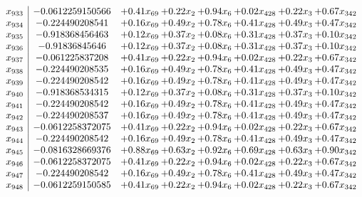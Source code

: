 \documentclass[8pt]{article}
\begin{document}
\[\begin{array}{c| c c@{\hskip 2pt} c@{\hskip 2pt} c@{\hskip 2pt} c@{\hskip 2pt} c@{\hskip 2pt} c@{\hskip 2pt} }
 x_{933}   &  -0.0612259150566 & +  0.41 x_{69} & +  0.22 x_{2} & +  0.94 x_{6} & +  0.02 x_{428} & +  0.22 x_{3} & +  0.67 x_{342}\\
 x_{934}   &  -0.224490208541 & +  0.16 x_{69} & +  0.49 x_{2} & +  0.78 x_{6} & +  0.41 x_{428} & +  0.49 x_{3} & +  0.47 x_{342}\\
 x_{935}   &  -0.918368456463 & +  0.12 x_{69} & +  0.37 x_{2} & +  0.08 x_{6} & +  0.31 x_{428} & +  0.37 x_{3} & +  0.10 x_{342}\\
 x_{936}   &  -0.91836845646 & +  0.12 x_{69} & +  0.37 x_{2} & +  0.08 x_{6} & +  0.31 x_{428} & +  0.37 x_{3} & +  0.10 x_{342}\\
 x_{937}   &  -0.061225837208 & +  0.41 x_{69} & +  0.22 x_{2} & +  0.94 x_{6} & +  0.02 x_{428} & +  0.22 x_{3} & +  0.67 x_{342}\\
 x_{938}   &  -0.224490208535 & +  0.16 x_{69} & +  0.49 x_{2} & +  0.78 x_{6} & +  0.41 x_{428} & +  0.49 x_{3} & +  0.47 x_{342}\\
 x_{939}   &  -0.224490208542 & +  0.16 x_{69} & +  0.49 x_{2} & +  0.78 x_{6} & +  0.41 x_{428} & +  0.49 x_{3} & +  0.47 x_{342}\\
 x_{940}   &  -0.918368534315 & +  0.12 x_{69} & +  0.37 x_{2} & +  0.08 x_{6} & +  0.31 x_{428} & +  0.37 x_{3} & +  0.10 x_{342}\\
 x_{941}   &  -0.224490208542 & +  0.16 x_{69} & +  0.49 x_{2} & +  0.78 x_{6} & +  0.41 x_{428} & +  0.49 x_{3} & +  0.47 x_{342}\\
 x_{942}   &  -0.224490208537 & +  0.16 x_{69} & +  0.49 x_{2} & +  0.78 x_{6} & +  0.41 x_{428} & +  0.49 x_{3} & +  0.47 x_{342}\\
 x_{943}   &  -0.0612258372075 & +  0.41 x_{69} & +  0.22 x_{2} & +  0.94 x_{6} & +  0.02 x_{428} & +  0.22 x_{3} & +  0.67 x_{342}\\
 x_{944}   &  -0.224490208542 & +  0.16 x_{69} & +  0.49 x_{2} & +  0.78 x_{6} & +  0.41 x_{428} & +  0.49 x_{3} & +  0.47 x_{342}\\
 x_{945}   &  -0.0816328669376 & +  0.88 x_{69} & +  0.63 x_{2} & +  0.92 x_{6} & +  0.69 x_{428} & +  0.63 x_{3} & +  0.90 x_{342}\\
 x_{946}   &  -0.0612258372075 & +  0.41 x_{69} & +  0.22 x_{2} & +  0.94 x_{6} & +  0.02 x_{428} & +  0.22 x_{3} & +  0.67 x_{342}\\
 x_{947}   &  -0.224490208542 & +  0.16 x_{69} & +  0.49 x_{2} & +  0.78 x_{6} & +  0.41 x_{428} & +  0.49 x_{3} & +  0.47 x_{342}\\
 x_{948}   &  -0.0612259150585 & +  0.41 x_{69} & +  0.22 x_{2} & +  0.94 x_{6} & +  0.02 x_{428} & +  0.22 x_{3} & +  0.67 x_{342}\\

\end{array}\]
\end{document}
